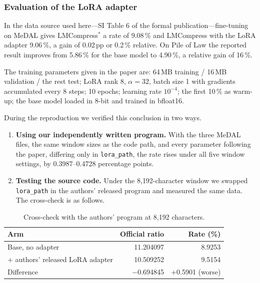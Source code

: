 \documentclass[12pt,a4paper]{article}
\begin{document}
\subsubsection{Evaluation of the LoRA adapter}

In the data source used here---SI Table 6 of the formal publication---fine-tuning on MeDAL
gives LMCompress$^{*}$ a rate of 9.08\,\% and LMCompress with the LoRA adapter 9.06\,\%, a
gain of 0.02\,pp or 0.2\,\% relative. On Pile of Law the reported result improves from
5.86\,\% for the base model to 4.90\,\%, a relative gain of 16\,\%.

The training parameters given in the paper are: 64\,MB training / 16\,MB validation / the
rest test; LoRA rank 8, $\alpha = 32$, batch size 1 with gradients accumulated every 8 steps;
10 epochs; learning rate $10^{-4}$; the first 10\,\% as warm-up; the base model loaded in
8-bit and trained in bfloat16.

During the reproduction we verified this conclusion in two ways.

\begin{enumerate}[label=\arabic*.,leftmargin=*]
  \item \textbf{Using our independently written program.} With the three MeDAL files, the
        same window sizes as the code path, and every parameter following the paper, differing
        only in \texttt{lora\_path}, the rate rises under all five window settings, by
        0.3987--0.4728 percentage points.
  \item \textbf{Testing the source code.} Under the 8{,}192-character window we swapped
        \texttt{lora\_path} in the authors' released program and measured the same data. The
        cross-check is as follows.
\end{enumerate}

\begin{table}[htbp]\centering\small
\caption{Cross-check with the authors' program at 8{,}192 characters.}
\begin{tabular}{@{}lrr@{}}
\toprule
Arm & Official ratio & Rate (\%) \\
\midrule
Base, no adapter & 11.204097 & 8.9253 \\
+ authors' released LoRA adapter & 10.509252 & 9.5154 \\
Difference & $-$0.694845 & +0.5901 (worse) \\
\bottomrule
\end{tabular}
\end{table}
\end{document}
